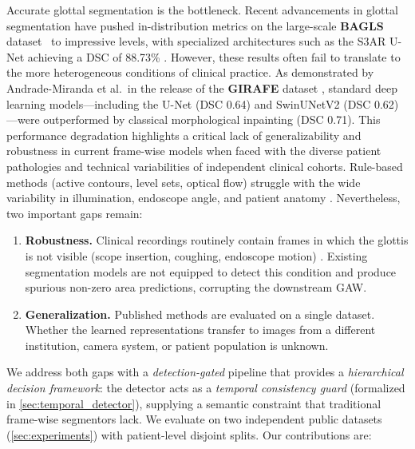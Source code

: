 \documentclass[preprint,12pt]{elsarticle}
\newcommand{\girafe}{\textbf{GIRAFE}}
\newcommand{\bagls}{\textbf{BAGLS}}
\newcommand{\gaw}{GAW}
\begin{document}
Accurate glottal segmentation is the bottleneck.
Recent advancements in glottal segmentation have pushed in-distribution
metrics on the large-scale \bagls{} dataset~\cite{gomez2020bagls} to impressive levels, with
specialized architectures such as the S3AR U-Net achieving a DSC of
\num{88.73}\% \cite{montalbo2024}.
However, these results often fail to translate to the more heterogeneous
conditions of clinical practice.
As demonstrated by Andrade-Miranda et al.\ in the release of the \girafe{}
dataset \cite{andrade2025datainbrief}, standard deep learning models---including
the U-Net (DSC \num{0.64}) and SwinUNetV2 (DSC \num{0.62})---were
outperformed by classical morphological inpainting (DSC \num{0.71}).
This performance degradation highlights a critical lack of generalizability
and robustness in current frame-wise models when faced with the diverse
patient pathologies and technical variabilities of independent clinical
cohorts.
Rule-based methods (active contours, level sets, optical flow) struggle with
the wide variability in illumination, endoscope angle, and patient anatomy
\cite{lohscheller2008laryngoscope}.
Nevertheless, two important gaps remain:

\begin{enumerate}
  \item \textbf{Robustness.}  Clinical recordings routinely contain frames in which
  the glottis is not visible (scope insertion, coughing, endoscope motion)
  \cite{deliyski2008laryngoscope}.
  Existing segmentation models are not equipped to detect this
    condition and produce spurious non-zero area predictions, corrupting the
    downstream \gaw{}.

  \item \textbf{Generalization.}  Published methods are evaluated on a single
    dataset.  Whether the learned representations transfer to images from a
    different institution, camera system, or patient population is unknown.
\end{enumerate}

We address both gaps with a \emph{detection-gated} pipeline that provides a
\emph{hierarchical decision framework}: the detector acts as a \emph{temporal
consistency guard} (formalized in \cref{sec:temporal_detector}), supplying a
semantic constraint that traditional frame-wise segmentors lack.
We evaluate on two independent public datasets (\cref{sec:experiments}) with
patient-level disjoint splits.
Our contributions are:
\end{document}
